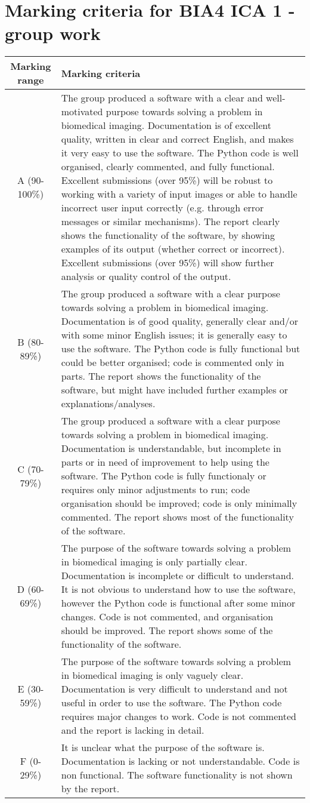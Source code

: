 \documentclass[10pt,a4paper,english]{report}
\begin{document}
\section*{Marking criteria for BIA4 ICA 1 - group work}

\begin{tabularx}{\textwidth}{|c|X|}
\hline 
\textbf{Marking range} & \textbf{Marking criteria}\\ 
\hline 
A (90-100\%) & The group produced a software with a clear and well-motivated purpose towards solving a problem in biomedical imaging. 
Documentation is of excellent quality, written in clear and correct English, and makes it very easy to use the software. 
The Python code is well organised, clearly commented, and fully functional. Excellent submissions (over 95\%) will be robust to working with a variety of input images or able to handle incorrect user input correctly (e.g. through error messages or similar mechanisms). 
The report clearly shows the functionality of the software, by showing examples of its output (whether correct or incorrect). Excellent submissions (over 95\%) will show further analysis or quality control of the output.\\
\hline 
B (80-89\%) & The group produced a software with a clear purpose towards solving a problem in biomedical imaging. Documentation is of good quality, generally clear and/or with some minor English issues; it is generally easy to use the software. The Python code is fully functional but could be better organised; code is commented only in parts. The report shows the functionality of the software, but might have included further examples or explanations/analyses.
\\ 
\hline 
C (70-79\%) & The group produced a software with a clear purpose towards solving a problem in biomedical imaging. Documentation is understandable, but incomplete in parts or in need of improvement to help using the software. The Python code is fully functionaly or requires only minor adjustments to run; code organisation should be improved; code is only minimally commented. The report shows most of the functionality of the software.\\
\hline 
D (60-69\%) & The purpose of the software towards solving a problem in biomedical imaging is only partially clear. Documentation is incomplete or difficult to understand. It is not obvious to understand how to use the software, however the Python code is functional after some minor changes. Code is not commented, and organisation should be improved. The report shows some of the functionality of the software.\\
\hline 
E (30-59\%)& The purpose of the software towards solving a problem in biomedical imaging is only vaguely clear. Documentation is very difficult to understand and not useful in order to use the software. The Python code requires major changes to work. Code is not commented and the report is lacking in detail.\\
\hline 
F (0-29\%) & It is unclear what the purpose of the software is. Documentation is lacking or not understandable. Code is non functional. The software functionality is not shown by the report.\\
\hline 
\end{tabularx} 
\end{document}
